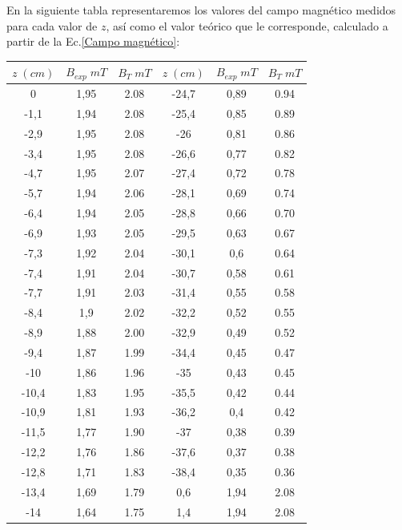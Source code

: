 \documentclass[a4paper,12pt,titlepage]{report}
\begin{document}
En la siguiente tabla representaremos los valores del campo magnético medidos para cada valor de $z$, así como el valor teórico que le corresponde, calculado a partir de la Ec.\ref{Campo magnético}:

\begin{longtable}[t]{|c|c|c|c|c|c|}
    \hline
    $z \; (cm)$ & $B_{exp} \; mT$ & $B_T \; mT$ & $z \; (cm)$ & $B_{exp} \; mT$ & $B_T \; mT$ \\ \hline
    0      & 1,95 & 2.08 & -24,7 & 0,89 & 0.94 \\ \hline
    -1,1   & 1,94 & 2.08 & -25,4 & 0,85 & 0.89 \\ \hline
    -2,9   & 1,95 & 2.08 & -26   & 0,81 & 0.86 \\ \hline
    -3,4   & 1,95 & 2.08 & -26,6 & 0,77 & 0.82 \\ \hline
    -4,7   & 1,95 & 2.07 & -27,4 & 0,72 & 0.78 \\ \hline
    -5,7   & 1,94 & 2.06 & -28,1 & 0,69 & 0.74 \\ \hline
    -6,4   & 1,94 & 2.05 & -28,8 & 0,66 & 0.70 \\ \hline
    -6,9   & 1,93 & 2.05 & -29,5 & 0,63 & 0.67 \\ \hline
    -7,3   & 1,92 & 2.04 & -30,1 & 0,6  & 0.64 \\ \hline
    -7,4   & 1,91 & 2.04 & -30,7 & 0,58 & 0.61 \\ \hline
    -7,7   & 1,91 & 2.03 & -31,4 & 0,55 & 0.58 \\ \hline
    -8,4   & 1,9  & 2.02 & -32,2 & 0,52 & 0.55 \\ \hline
    -8,9   & 1,88 & 2.00 & -32,9 & 0,49 & 0.52 \\ \hline
    -9,4   & 1,87 & 1.99 & -34,4 & 0,45 & 0.47 \\ \hline
    -10    & 1,86 & 1.96 & -35   & 0,43 & 0.45 \\ \hline
    -10,4  & 1,83 & 1.95 & -35,5 & 0,42 & 0.44 \\ \hline
    -10,9  & 1,81 & 1.93 & -36,2 & 0,4  & 0.42 \\ \hline
    -11,5  & 1,77 & 1.90 & -37   & 0,38 & 0.39 \\ \hline
    -12,2  & 1,76 & 1.86 & -37,6 & 0,37 & 0.38 \\ \hline
    -12,8  & 1,71 & 1.83 & -38,4 & 0,35 & 0.36 \\ \hline
    -13,4  & 1,69 & 1.79 & 0,6   & 1,94 & 2.08 \\ \hline
    -14    & 1,64 & 1.75 & 1,4   & 1,94 & 2.08 \\ \hline

\end{longtable}
\end{document}
